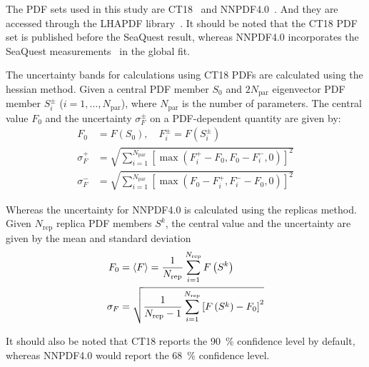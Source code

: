 \documentclass[../main.tex]{subfiles}
\begin{document}
The PDF sets used in this study are CT18~\cite{hou2021} and NNPDF4.0~\cite{ball2022a}.
And they are accessed through the LHAPDF library~\cite{buckley2015}. It should be noted
that the CT18 PDF set is published before the SeaQuest result, whereas NNPDF4.0
incorporates the SeaQuest measurements~\cite{dove2021} in the global fit.

The uncertainty bands for calculations using CT18 PDFs are calculated using the hessian method.
Given a central PDF member $S_0$ and $2N_{\mathrm{par}}$ eigenvector PDF member $S^\pm_i$ ($i=1,\dots,N_{\mathrm{par}}$),
where $N_{\mathrm{par}}$ is the number of parameters. The central value $F_0$ and the uncertainty $\sigma^\pm_F$
on a PDF-dependent quantity are given by:
\begin{equation}
	\begin{split}
		F_0        & = F(S_0),\quad F_i^\pm=F(S_i^\pm)                                                                  \\
		\sigma^+_F & = \sqrt{\sum_{i=1}^{N_{\mathrm{par}}} \left[\max\left(F_i^+ - F_0, F_0 - F^-_i,0\right)\right]^2 } \\
		\sigma^-_F & = \sqrt{\sum_{i=1}^{N_{\mathrm{par}}} \left[\max\left(F_0 - F^+_i, F_i^- - F_0,0\right)\right]^2 }
	\end{split}
\end{equation}

Whereas the uncertainty for NNPDF4.0 is calculated using the replicas method. Given $N_{\mathrm{rep}}$ replica
PDF members $S^k$, the central value and the uncertainty are given by the mean and standard deviation
\begin{equation}
	\begin{split}
		F_0      & =\expval{F}=\frac{1}{N_{\mathrm{rep}}}\sum_{i=1}^{N_{\mathrm{rep}}}F\left(S^k\right)                   \\
		\sigma_F & = \sqrt{\frac{1}{N_{\mathrm{rep}}-1}\sum_{i=1}^{N_{\mathrm{rep}}}\left[F\left(S^k\right)-F_0\right]^2}
	\end{split}
\end{equation}

It should also be noted that CT18 reports the \SI{90}{\percent} confidence level by default, whereas NNPDF4.0
would report the \SI{68}{\percent} confidence level.
\end{document}
